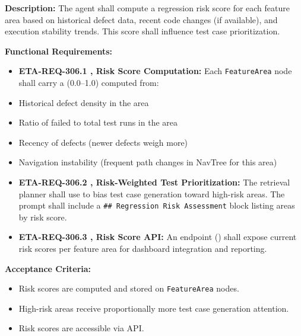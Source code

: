 \textbf{Description:}
The agent shall compute a regression risk score for each feature area based on historical defect data, recent code changes (if available), and execution stability trends. This score shall influence test case prioritization.

\textbf{Functional Requirements:}

\begin{itemize}[leftmargin=1.4em,itemsep=1pt,topsep=3pt]
  \item \textbf{ETA-REQ-306.1 ,  Risk Score Computation:} Each \texttt{FeatureArea} node shall carry a  (0.0--1.0) computed from:
  \item Historical defect density in the area
  \item Ratio of failed to total test runs in the area
  \item Recency of defects (newer defects weigh more)
  \item Navigation instability (frequent path changes in NavTree for this area)
\end{itemize}

\begin{itemize}[leftmargin=1.4em,itemsep=1pt,topsep=3pt]
  \item \textbf{ETA-REQ-306.2 ,  Risk-Weighted Test Prioritization:} The retrieval planner shall use  to bias test case generation toward high-risk areas. The prompt shall include a \texttt{\#\# Regression Risk Assessment} block listing areas by risk score.
\end{itemize}

\begin{itemize}[leftmargin=1.4em,itemsep=1pt,topsep=3pt]
  \item \textbf{ETA-REQ-306.3 ,  Risk Score API:} An endpoint () shall expose current risk scores per feature area for dashboard integration and reporting.
\end{itemize}

\textbf{Acceptance Criteria:}
\begin{itemize}[leftmargin=1.4em,itemsep=1pt,topsep=3pt]
  \item Risk scores are computed and stored on \texttt{FeatureArea} nodes.
  \item High-risk areas receive proportionally more test case generation attention.
  \item Risk scores are accessible via API.
\end{itemize}

